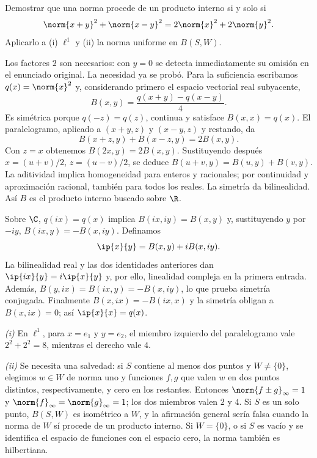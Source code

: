 \begin{ejercicio}
Demostrar que una norma procede de un producto interno si y solo si
\[
 \norm{x+y}^{2}+\norm{x-y}^{2}=2\norm{x}^{2}+2\norm{y}^{2}.
\]
Aplicarlo a (i) $\ell^{1}$ y (ii) la norma uniforme en $B(S,W)$.
\end{ejercicio}
\begin{solucion}
Los factores $2$ son necesarios: con $y=0$ se detecta inmediatamente su omisión en el enunciado original. La necesidad ya se probó. Para la suficiencia escribamos $q(x)=\norm{x}^{2}$ y, considerando primero el espacio vectorial real subyacente,
\[
 B(x,y)=\frac{q(x+y)-q(x-y)}4.
\]
Es simétrica porque $q(-z)=q(z)$, continua y satisface $B(x,x)=q(x)$. El paralelogramo, aplicado a $(x+y,z)$ y $(x-y,z)$ y restando, da
\[
 B(x+z,y)+B(x-z,y)=2B(x,y).
\]
Con $z=x$ obtenemos $B(2x,y)=2B(x,y)$. Sustituyendo después $x=(u+v)/2$, $z=(u-v)/2$, se deduce $B(u+v,y)=B(u,y)+B(v,y)$. La aditividad implica homogeneidad para enteros y racionales; por continuidad y aproximación racional, también para todos los reales. La simetría da bilinealidad. Así $B$ es el producto interno buscado sobre $\R$.

Sobre $\C$, $q(ix)=q(x)$ implica $B(ix,iy)=B(x,y)$ y, sustituyendo $y$ por $-iy$, $B(ix,y)=-B(x,iy)$. Definamos
\[
 \ip{x}{y}=B(x,y)+iB(x,iy).
\]
La bilinealidad real y las dos identidades anteriores dan $\ip{ix}{y}=i\ip{x}{y}$ y, por ello, linealidad compleja en la primera entrada. Además, $B(y,ix)=B(ix,y)=-B(x,iy)$, lo que prueba simetría conjugada. Finalmente $B(x,ix)=-B(ix,x)$ y la simetría obligan a $B(x,ix)=0$; así $\ip{x}{x}=q(x)$.

\emph{(i)} En $\ell^{1}$, para $x=e_1$ y $y=e_2$, el miembro izquierdo del paralelogramo vale $2^2+2^2=8$, mientras el derecho vale $4$.

\emph{(ii)} Se necesita una salvedad: si $S$ contiene al menos dos puntos y $W\ne\{0\}$, elegimos $w\in W$ de norma uno y funciones $f,g$ que valen $w$ en dos puntos distintos, respectivamente, y cero en los restantes. Entonces $\norm{f\pm g}_\infty=1$ y $\norm{f}_\infty=\norm{g}_\infty=1$; los dos miembros valen $2$ y $4$. Si $S$ es un solo punto, $B(S,W)$ es isométrico a $W$, y la afirmación general sería falsa cuando la norma de $W$ sí procede de un producto interno. Si $W=\{0\}$, o si $S$ es vacío y se identifica el espacio de funciones con el espacio cero, la norma también es hilbertiana.
\end{solucion}

